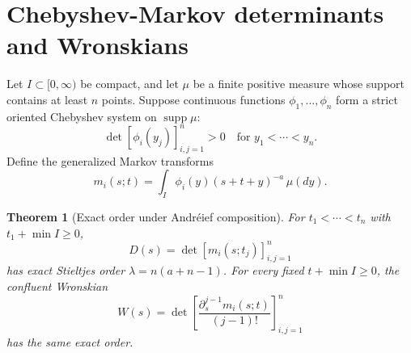 \documentclass[11pt]{article}
\newtheorem{theorem}{Theorem}[section]
\theoremstyle{definition}
\theoremstyle{remark}
\newcommand{\supp}{\operatorname{supp}}
\begin{document}
\section{Chebyshev-Markov determinants and Wronskians}

Let $I\subset[0,\infty)$ be compact, and let $\mu$ be a finite positive
measure whose support contains at least $n$ points. Suppose continuous
functions $\phi_1,\ldots,\phi_n$ form a strict oriented Chebyshev system on
$\supp\mu$:
\begin{equation}\label{eq:chebyshev}
\det[\phi_i(y_j)]_{i,j=1}^{n}>0
\quad\text{for }y_1<\cdots<y_n.
\end{equation}
Define the generalized Markov transforms
\begin{equation}\label{eq:markov-functions}
m_i(s;t)=\int_I\phi_i(y)(s+t+y)^{-a}\,\mu(dy).
\end{equation}

\begin{theorem}[Exact order under Andr\'eief composition]
\label{thm:markov}
For $t_1<\cdots<t_n$ with $t_1+\min I\ge0$,
\begin{equation}\label{eq:markov-det}
D(s)=\det[m_i(s;t_j)]_{i,j=1}^{n}
\end{equation}
has exact Stieltjes order $\lambda=n(a+n-1)$. For every fixed
$t+\min I\ge0$, the confluent Wronskian
\begin{equation}\label{eq:wronskian}
W(s)=\det\left[
\frac{\partial_s^{j-1}m_i(s;t)}{(j-1)!}
\right]_{i,j=1}^{n}
\end{equation}
has the same exact order.
\end{theorem}
\end{document}
